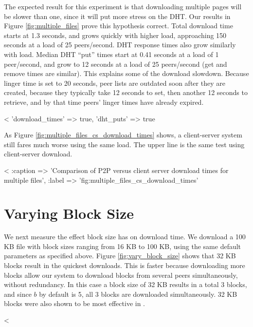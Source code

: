 The expected result for this experiment is that downloading multiple pages will be slower than one, 
since it will put more stress on the DHT.  Our results in Figure \ref{fig:multiple_files} prove
this hypothesis correct.  Total download time starts at 1.3 seconds, and grows quickly with higher load, approaching 
150 seconds at a load of 25 peers/second. DHT response times also grow similarly with load.  Median DHT ``put'' times start 
at 0.41 seconds at a load of 1 peer/second, and grow to 12 seconds at a load of 25 peers/second (get and remove times are similar).
This explains some of the download slowdown.  Because linger time is set to 20 seconds, peer lists are outdated soon after they are created, because
they typically take 12 seconds to set, then another 12 seconds to retrieve, and by that time peers' linger times have already expired.


<%
   {'download_times' => true, 'dht_puts' => true} %

As Figure \ref{fig:multiple_files_cs_download_times} shows, a client-server system still fares much worse using the same load.  The upper line is the same test using client-server download.

<%
  :caption => 'Comparison of P2P versus client server download times for multiple files', :label => 'fig:multiple_files_cs_download_times' %

\section{Varying Block Size}

We next measure the effect block size has on download time. We download a 100 KB file with block sizes ranging from 
16 KB to 100 KB, using the same default parameters as specified above.  Figure \ref{fig:vary_block_size} shows that 32 KB blocks result
in the quickest downloads.  This is faster because downloading more blocks allow our system to download 
blocks from several peers simultaneously, without redundancy.  In this case a block size of 32 KB results in a total 3 blocks, and since $b$ by default is 5, all 3 blocks
are downloaded simultaneously. 32 KB blocks were also shown to be most effective in \cite{32_kb_blocks}.

<%

